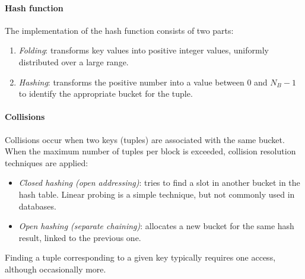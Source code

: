 \paragraph*{Hash function}
The implementation of the hash function consists of two parts:
\begin{enumerate}
    \item \textit{Folding}: transforms key values into positive integer values, uniformly distributed over a large range.
    \item \textit{Hashing}: transforms the positive number into a value between $0$ and $N_B-1$ to identify the appropriate bucket for the tuple.
\end{enumerate}

\paragraph*{Collisions}
Collisions occur when two keys (tuples) are associated with the same bucket. 
When the maximum number of tuples per block is exceeded, collision resolution techniques are applied:
\begin{itemize}
    \item \textit{Closed hashing (open addressing)}: tries to find a slot in another bucket in the hash table.
        Linear probing is a simple technique, but not commonly used in databases.
    \item \textit{Open hashing (separate chaining)}: allocates a new bucket for the same hash result, linked to the previous one.
\end{itemize}
Finding a tuple corresponding to a given key typically requires one access, although occasionally more. 

